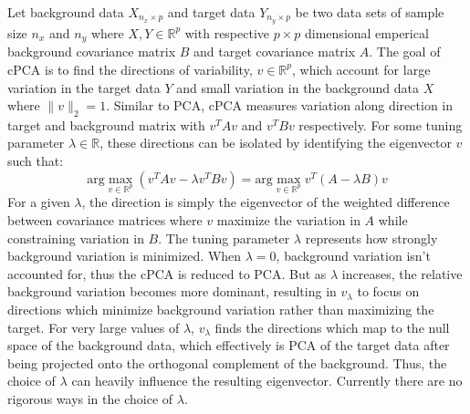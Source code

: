 \documentclass[12pt]{article}
\begin{document}
Let background data $X_{n_{x}\times p}$ and target data $Y_{n_{y} \times p}$ be two data sets of sample size $n_x$ and $n_y$ where $X, Y \in \mathbb{R}^{p}$ with respective $p \times p$ dimensional emperical background covariance matrix $B$ and target covariance matrix $A$.
The goal of cPCA is to find the directions of variability, $v \in \mathbb{R}^p$, which account for large variation in the target data $Y$ and small variation in the background data $X$ where $\|v\|_2 = 1$. 
Similar to PCA, cPCA measures variation along direction in target and background matrix with $v^T A v$ and $v^T Bv$ respectively.
For some tuning parameter $\lambda \in \mathbb{R}$, these directions can be isolated by identifying the eigenvector $v$ such that:
\[\text{arg}\max_{v \in \mathbb{R}^p}{\left(v^TAv - \lambda v^TBv\right)} = \text{arg}\max_{v \in \mathbb{R}^p}{v^T\left(A - \lambda B\right)v}\]
For a given $\lambda$, the direction is simply the eigenvector of the weighted difference between covariance matrices where $v$ maximize the variation in $A$ while constraining variation in $B$. 
The tuning parameter $\lambda$ represents how strongly background variation is minimized. When $\lambda = 0$, background variation isn't accounted for, thus the cPCA is reduced to PCA. But as $\lambda$ increases, the relative background variation becomes more dominant, resulting in $v_\lambda$ to focus on directions which minimize background variation rather than maximizing the target. For very large values of $\lambda$, $v_\lambda$ finds the directions which map to the null space of the background data, which effectively is PCA of the target data after being projected onto the orthogonal complement of the background.  Thus, the choice of $\lambda$ can heavily influence the resulting eigenvector. Currently there are no rigorous ways in the choice of $\lambda$.
\end{document}
